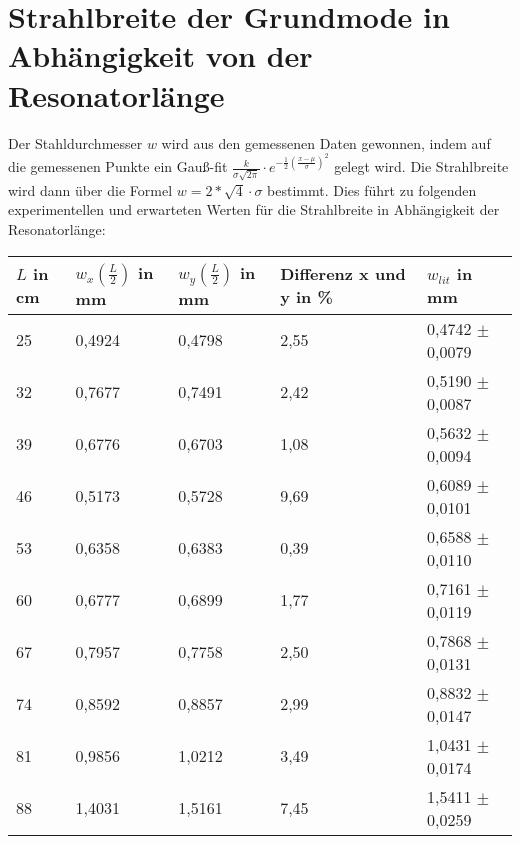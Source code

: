 \documentclass[bigchapter,colorback,accentcolor=tud4b,linedtoc,11pt]{tudreport}
\numberwithin{equation}{subsection}
\begin{document}
\section{Strahlbreite der Grundmode in Abhängigkeit von der Resonatorlänge}
Der Stahldurchmesser $w$ wird aus den gemessenen Daten gewonnen, indem auf die gemessenen Punkte ein Gauß-fit 
$\frac{k}{\sigma\sqrt{2\pi}} \cdot {e}^{-\frac{1}{2}\left(\frac{x-\mu}{\sigma}\right)^{2}}$
gelegt wird. Die Strahlbreite wird dann über die Formel
$w=2*\sqrt{4}\cdot\sigma$
bestimmt. Dies führt zu folgenden experimentellen und erwarteten Werten für die Strahlbreite in Abhängigkeit der Resonatorlänge:
\begin{center}
    \begin{tabular}{ | l | l | l | l | p{4cm} |}
    \hline
    $L$ in cm & $w_x\left(\frac{L}{2}\right)$ in mm & $w_y\left(\frac{L}{2}\right)$ in mm & Differenz x und y in \% & $w_{lit}$ in mm \\ \hline
    25 & 0,4924 & 0,4798 & 2,55 & 0,4742 $\pm$0,0079 \\ \hline
    32 & 0,7677 & 0,7491 & 2,42 & 0,5190 $\pm$0,0087 \\ \hline
    39 & 0,6776 & 0,6703 & 1,08 & 0,5632 $\pm$0,0094 \\ \hline
    46 & 0,5173 & 0,5728 & 9,69 & 0,6089 $\pm$0,0101 \\ \hline
    53 & 0,6358 & 0,6383 & 0,39 & 0,6588 $\pm$0,0110 \\ \hline
    60 & 0,6777 & 0,6899 & 1,77 & 0,7161 $\pm$0,0119 \\ \hline
    67 & 0,7957 & 0,7758 & 2,50 & 0,7868 $\pm$0,0131 \\ \hline
    74 & 0,8592 & 0,8857 & 2,99 & 0,8832 $\pm$0,0147 \\ \hline
    81 & 0,9856 & 1,0212 & 3,49 & 1,0431 $\pm$0,0174 \\ \hline
    88 & 1,4031 & 1,5161 & 7,45 & 1,5411 $\pm$0,0259 \\ \hline
    
    \end{tabular}
\end{center}
\end{document}
